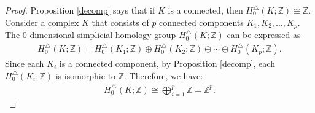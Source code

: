 \begin{proof}
	Proposition \ref{decomp} says that if \( K \) is a connected, then \( H^{\triangle}_{0}(K; \mathbb{Z}) \cong \mathbb{Z} \). Consider a complex \( K \) that consists of \( p \) connected components \( K_1, K_2, \ldots, K_p \). The $0$-dimensional simplicial homology group \( H^{\triangle}_{0}(K; \mathbb{Z}) \) can be expressed as
	\begin{align}
		H^{\triangle}_{0}(K; \mathbb{Z}) = H^{\triangle}_{0}(K_1; \mathbb{Z}) \oplus H^{\triangle}_{0}(K_2; \mathbb{Z}) \oplus \cdots \oplus H^{\triangle}_{0}(K_p; \mathbb{Z}). 
	\end{align}	
	Since each \( K_i \) is a connected component, by Proposition \ref{decomp}, each \( H^{\triangle}_{0}(K_i; \mathbb{Z}) \) is isomorphic to \( \mathbb{Z} \). Therefore, we have:
	\begin{align}
		H^{\triangle}_{0}(K; \mathbb{Z}) \cong \bigoplus_{i=1}^p \mathbb{Z} = \mathbb{Z}^{p}. 
	\end{align}
\end{proof}

